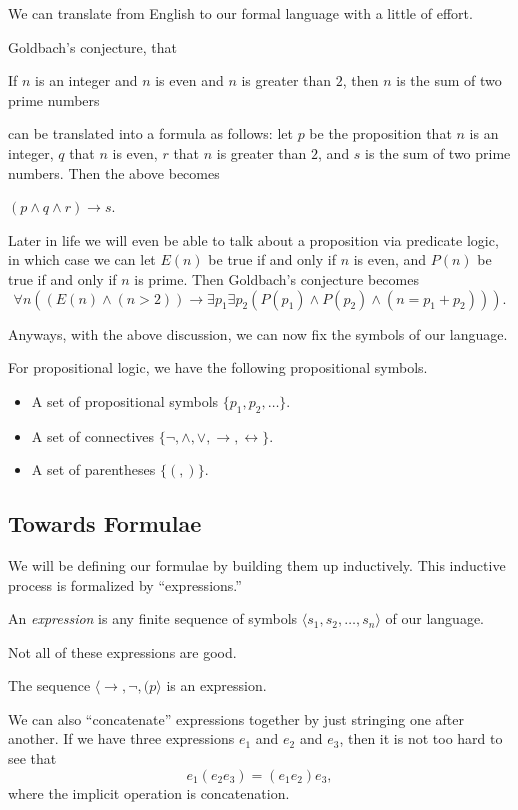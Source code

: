 We can translate from English to our formal language with a little of effort.
\begin{example}
	Goldbach's conjecture, that
	\begin{center}
		If $n$ is an integer and $n$ is even and $n$ is greater than $2$, then $n$ is the sum of two prime numbers
	\end{center}
	can be translated into a formula as follows: let $p$ be the proposition that $n$ is an integer, $q$ that $n$ is even, $r$ that $n$ is greater than $2$, and $s$ is the sum of two prime numbers. Then the above becomes
	\begin{center}
		$(p\land q\land r)\to s$.
	\end{center}
\end{example}
\begin{remark}
	Later in life we will even be able to talk about a proposition via predicate logic, in which case we can let $E(n)$ be true if and only if $n$ is even, and $P(n)$ be true if and only if $n$ is prime. Then Goldbach's conjecture becomes
	\[\forall n((E(n)\land(n>2))\to\exists p_1\exists p_2(P(p_1)\land P(p_2)\land(n=p_1+p_2))).\]
\end{remark}
Anyways, with the above discussion, we can now fix the symbols of our language.
\begin{defi}[Symbols]
	For propositional logic, we have the following propositional symbols.
	\begin{itemize}
		\item A set of propositional symbols $\{p_1,p_2,\ldots\}$.
		\item A set of connectives $\{\lnot,\land,\lor,\to,\leftrightarrow\}$.
		\item A set of parentheses $\{(,)\}$.
	\end{itemize}
\end{defi}

\subsection{Towards Formulae}
We will be defining our formulae by building them up inductively. This inductive process is formalized by ``expressions.''
\begin{definition}[Expression]
	An \textit{expression} is any finite sequence of symbols $\langle s_1,s_2,\ldots,s_n\rangle$ of our language.
\end{definition}
Not all of these expressions are good.
\begin{example}
	The sequence $\langle\to,\lnot,(p\rangle$ is an expression.
\end{example}
We can also ``concatenate'' expressions together by just stringing one after another. If we have three expressions $e_1$ and $e_2$ and $e_3$, then it is not too hard to see that
\[e_1(e_2e_3)=(e_1e_2)e_3,\]
where the implicit operation is concatenation.

